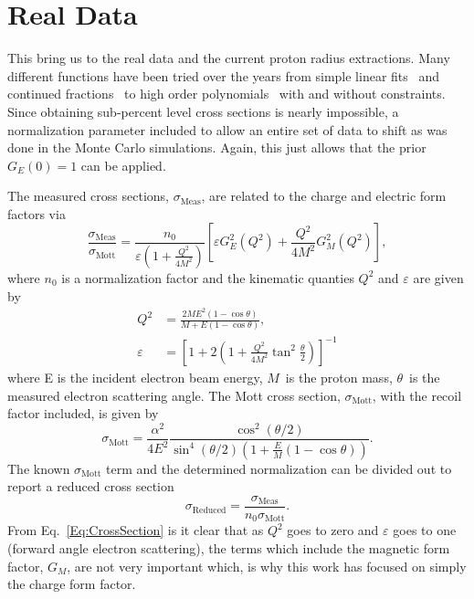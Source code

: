 \documentclass[10pt,aps,prc,twocolumn]{revtex4-1}
\begin{document}
\section{Real Data}

This bring us to the real data and the current proton radius extractions.   Many different functions have
been tried over the years from simple linear fits~\cite{Hand:1963zz,Murphy:1974zz} and continued fractions~\cite{Sick:2003gm} 
to high order polynomials~\cite{Bernauer:2013tpr,Lee:2015jqa} with and without constraints.   Since obtaining sub-percent
level cross sections is nearly impossible, a normalization parameter included to allow an entire set of data to shift
as was done in the Monte Carlo simulations.   Again, this just allows that the prior $G_E(0)=1$ can be applied.

The measured cross sections, $\sigma_{\mathrm{Meas}}$,  are related to the charge and electric form factors via 
\begin{equation}
\frac{\sigma_{\text{Meas}}}{\sigma_{\text{Mott}}} = \frac{n_0}{\varepsilon (1 + \frac{Q^2}{4M^2})} \left[\varepsilon G_E^2 (Q^2) + \frac{Q^2}{4M^2} G_M^2 (Q^2)\right],
\label{Eq:CrossSection}
\end{equation}
where $n_0$ is a normalization factor and the kinematic quanties $Q^2$ and $\varepsilon$ are given by
\begin{align}
Q^2 & = \frac{2M E^2 (1 - \cos{\theta})}{M + E (1 - \cos{\theta})}, \\
\varepsilon & = \left[1 + 2(1 + \frac{Q^2}{4M^2}  \tan^2{\frac{\theta}{2}})\right]^{-1}
\end{align}
where E is the incident electron beam energy, $M$~is the proton mass, $\theta$~is the measured electron scattering angle. 
The Mott cross section, $\sigma_{\text{Mott}}$, with the recoil factor included, is given by
\begin{equation}
\sigma_{\text{Mott}}  = \frac{\alpha^2}{4 E^2} \frac{\cos^2{(\theta / 2)}}{\sin^4{(\theta / 2)} ( 1 + \frac{E}{M} (1 - \cos{\theta}))}.
\end{equation}
The known $\sigma_{\text{Mott}}$ term and the determined normalization can be divided out to report a reduced cross section
\begin{equation}
\sigma_{\text{Reduced}} = \frac{ {\sigma_{\text{Meas}}}}{{n_0 \sigma_{\text{Mott}}}}.
\label{Eq:Reduced}
\end{equation}
From Eq.~\ref{Eq:CrossSection} is it clear that as $Q^2$ goes to zero and $\varepsilon$ goes to one (forward angle electron scattering), 
the terms which include the  magnetic form factor, $G_M$, are not very important which, is why this work has
focused on simply the charge form factor.
\end{document}
